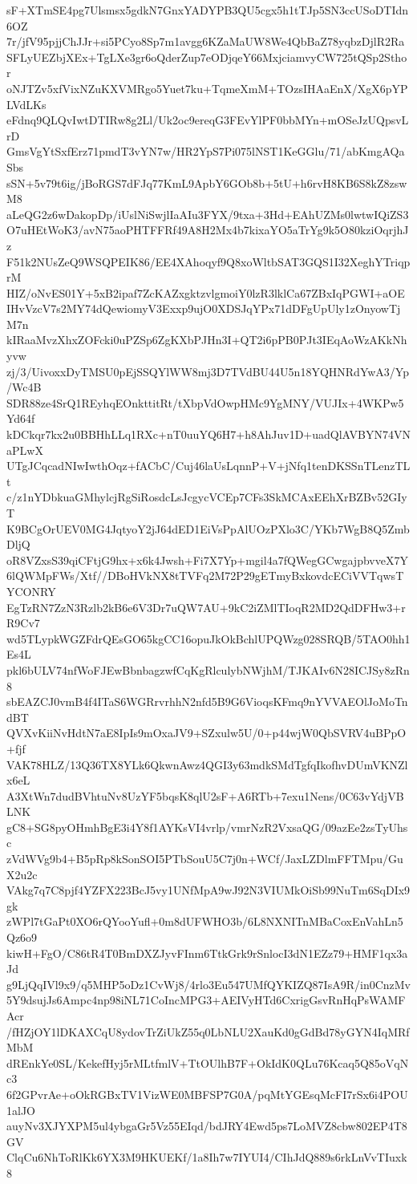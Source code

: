 sF+XTmSE4pg7Ulsmsx5gdkN7GnxYADYPB3QU5cgx5h1tTJp5SN3ccUSoDTIdn6OZ
7r/jfV95pjjChJJr+si5PCyo8Sp7m1avgg6KZaMaUW8We4QbBaZ78yqbzDjlR2Ra
SFLyUEZbjXEx+TgLXe3gr6oQderZup7eODjqeY66MxjciamvyCW725tQSp2Sthor
oNJTZv5xfVixNZuKXVMRgo5Yuet7ku+TqmeXmM+TOzsIHAaEnX/XgX6pYPLVdLKs
eFdnq9QLQvIwtDTIRw8g2Ll/Uk2oc9ereqG3FEvYlPF0bbMYn+mOSeJzUQpsvLrD
GmsVgYtSxfErz71pmdT3vYN7w/HR2YpS7Pi075lNST1KeGGlu/71/abKmgAQaSbs
sSN+5v79t6ig/jBoRGS7dFJq77KmL9ApbY6GOb8b+5tU+h6rvH8KB6S8kZ8zswM8
aLeQG2z6wDakopDp/iUslNiSwjlIaAIu3FYX/9txa+3Hd+EAhUZMs0lwtwIQiZS3
O7uHEtWoK3/avN75aoPHTFFRf49A8H2Mx4b7kixaYO5aTrYg9k5O80kziOqrjhJz
F51k2NUsZeQ9WSQPEIK86/EE4XAhoqyf9Q8xoWltbSAT3GQS1I32XeghYTriqprM
HIZ/oNvES01Y+5xB2ipaf7ZcKAZxgktzvlgmoiY0lzR3lklCa67ZBxIqPGWI+aOE
IHvVzcV7s2MY74dQewiomyV3Exxp9ujO0XDSJqYPx71dDFgUpUly1zOnyowTjM7n
kIRaaMvzXhxZOFcki0uPZSp6ZgKXbPJHn3I+QT2i6pPB0PJt3IEqAoWzAKkNhyvw
zj/3/UivoxxDyTMSU0pEjSSQYlWW8mj3D7TVdBU44U5n18YQHNRdYwA3/Yp/Wc4B
SDR88ze4SrQ1REyhqEOnkttitRt/tXbpVdOwpHMc9YgMNY/VUJIx+4WKPw5Yd64f
kDCkqr7kx2u0BBHhLLq1RXc+nT0uuYQ6H7+h8AhJuv1D+uadQlAVBYN74VNaPLwX
UTgJCqcadNIwIwthOqz+fACbC/Cuj46laUsLqnnP+V+jNfq1tenDKSSnTLenzTLt
c/z1nYDbkuaGMhylcjRgSiRosdcLsJcgycVCEp7CFs3SkMCAxEEhXrBZBv52GIyT
K9BCgOrUEV0MG4JqtyoY2jJ64dED1EiVsPpAlUOzPXlo3C/YKb7WgB8Q5ZmbDljQ
oR8VZxsS39qiCFtjG9hx+x6k4Jwsh+Fi7X7Yp+mgil4a7fQWegGCwgajpbvveX7Y
6lQWMpFWs/Xtf//DBoHVkNX8tTVFq2M72P29gETmyBxkovdcECiVVTqwsTYCONRY
EgTzRN7ZzN3Rzlb2kB6e6V3Dr7uQW7AU+9kC2iZMlTIoqR2MD2QdDFHw3+rR9Cv7
wd5TLypkWGZFdrQEsGO65kgCC16opuJkOkBchlUPQWzg028SRQB/5TAO0hh1Es4L
pkl6bULV74nfWoFJEwBbnbagzwfCqKgRlculybNWjhM/TJKAIv6N28ICJSy8zRn8
sbEAZCJ0vmB4f4ITaS6WGRrvrhhN2nfd5B9G6VioqsKFmq9nYVVAEOlJoMoTndBT
QVXvKiiNvHdtN7aE8IpIs9mOxaJV9+SZxulw5U/0+p44wjW0QbSVRV4uBPpO+fjf
VAK78HLZ/13Q36TX8YLk6QkwnAwz4QGI3y63mdkSMdTgfqIkofhvDUmVKNZlx6eL
A3XtWn7dudBVhtuNv8UzYF5bqsK8qlU2sF+A6RTb+7exu1Nens/0C63vYdjVBLNK
gC8+SG8pyOHmhBgE3i4Y8f1AYKsVI4vrlp/vmrNzR2VxsaQG/09azEe2zsTyUhsc
zVdWVg9b4+B5pRp8kSonSOI5PTbSouU5C7j0n+WCf/JaxLZDlmFFTMpu/GuX2u2c
VAkg7q7C8pjf4YZFX223BcJ5vy1UNfMpA9wJ92N3VIUMkOiSb99NuTm6SqDIx9gk
zWPl7tGaPt0XO6rQYooYufl+0m8dUFWHO3b/6L8NXNITnMBaCoxEnVahLn5Qz6o9
kiwH+FgO/C86tR4T0BmDXZJyvFInm6TtkGrk9rSnlocI3dN1EZz79+HMF1qx3aJd
g9LjQqIVl9x9/q5MHP5oDz1CvWj8/4rlo3Eu547UMfQYKIZQ87IsA9R/in0CnzMv
5Y9dsujJs6Ampc4np98iNL71CoIncMPG3+AEIVyHTd6CxrigGsvRnHqPsWAMFAcr
/fHZjOY1lDKAXCqU8ydovTrZiUkZ55q0LbNLU2XauKd0gGdBd78yGYN4IqMRfMbM
dREnkYe0SL/KekefHyj5rMLtfmlV+TtOUlhB7F+OkIdK0QLu76Kcaq5Q85oVqNc3
6f2GPvrAe+oOkRGBxTV1VizWE0MBFSP7G0A/pqMtYGEsqMcFI7rSx6i4POU1alJO
auyNv3XJYXPM5ul4ybgaGr5Vz55EIqd/bdJRY4Ewd5ps7LoMVZ8cbw802EP4T8GV
ClqCu6NhToRlKk6YX3M9HKUEKf/1a8Ih7w7IYUI4/CIhJdQ889s6rkLnVvTIuxk8
